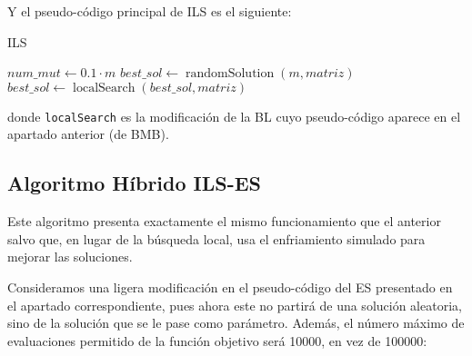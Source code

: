 \documentclass[11pt,a4paper]{article}
\begin{document}
Y el pseudo-código principal de ILS es el siguiente:

\begin{algorithm}[H]
	\DontPrintSemicolon %
	\caption{{\sc ILS}}
	$num\_mut \gets 0.1\cdot m$\;
	$best\_sol\gets \operatorname{randomSolution}(m,matriz)$\;
	$best\_sol\gets \operatorname{localSearch}(best\_sol,matriz)$\;

	\;
\end{algorithm}

donde \lstinline|localSearch| es la modificación de la BL cuyo pseudo-código aparece en el apartado anterior (de BMB).

\subsection{Algoritmo Híbrido ILS-ES}

Este algoritmo presenta exactamente el mismo funcionamiento que el anterior salvo que, en lugar de la búsqueda local, usa el enfriamiento simulado para mejorar las soluciones. 

Consideramos una ligera modificación en el pseudo-código del ES presentado en el apartado correspondiente, pues ahora este no partirá de una solución aleatoria, sino de la solución que se le pase como parámetro. Además, el número máximo de evaluaciones permitido de la función objetivo será 10000, en vez de 100000:\\
\end{document}
